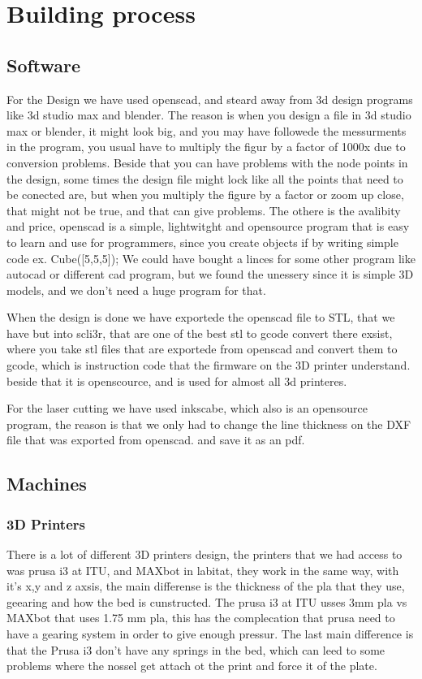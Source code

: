 \section{Building process}
\subsection{Software}
For the Design we have used openscad, and steard away from 3d design programs like 3d studio max and blender.
The reason is when you design a file in 3d studio max or blender, it might look big, and you may have followede the messurments in the program, you usual have to multiply the figur by a factor of 1000x due to conversion problems. Beside that you can have problems with the node points in the design, some times the design file might lock like all the points that need to be conected are, but when you multiply the figure by a factor or zoom up close, that might not be true, and that can give problems.
The othere is the avalibity and price, openscad is a simple, lightwitght and opensource program that is easy to learn and use for programmers, since you create objects if by writing simple code ex. Cube([5,5,5]); 
We could have bought a linces for some other program like autocad or different cad program, but we found the unessery since it is simple 3D models, and we don't need a huge program for that.

When the design is done we have exportede the openscad file to STL, that we have but into scli3r, that are one of the best stl to gcode convert there exsist, where you take stl files that are exportede from openscad and convert them to gcode, which is instruction code that the firmware on the 3D printer understand. beside that it is openscource, and is used for almost all 3d printeres.

For the laser cutting we have used inkscabe, which also is an opensource program, the reason is that we only had to change the line thickness on the DXF file that was exported from openscad. and save it as an pdf. 

\subsection{Machines}
\subsubsection{3D Printers}
There is a lot of different 3D printers design, the printers that we had access to was prusa i3 at ITU, and MAXbot in labitat, they work in the same way, with it's x,y  and z axsis, the main differense is the thickness of the pla that they use, geearing and how the bed is cunstructed. The prusa i3 at ITU usses 3mm pla vs MAXbot that uses 1.75 mm pla, this has the complecation that prusa need to have a gearing system in order to give enough pressur.
The last main difference is that the Prusa i3 don't have any springs in the bed, which can leed to some problems where the nossel get attach ot the print and force it of the plate.

